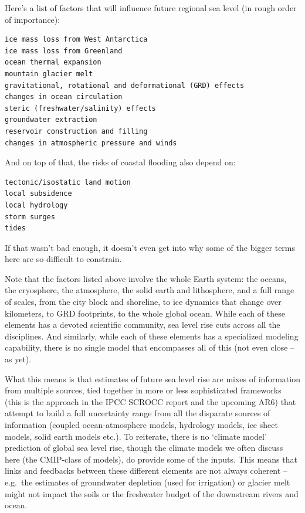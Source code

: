 \documentclass[
]{book}
\begin{document}
Here's a list of factors that will influence future regional sea level (in rough order of importance):

\begin{verbatim}
ice mass loss from West Antarctica
ice mass loss from Greenland
ocean thermal expansion
mountain glacier melt
gravitational, rotational and deformational (GRD) effects
changes in ocean circulation
steric (freshwater/salinity) effects
groundwater extraction
reservoir construction and filling
changes in atmospheric pressure and winds
\end{verbatim}

And on top of that, the risks of coastal flooding also depend on:

\begin{verbatim}
tectonic/isostatic land motion
local subsidence
local hydrology
storm surges
tides
\end{verbatim}

If that wasn't bad enough, it doesn't even get into why some of the bigger terms here are so difficult to constrain.

Note that the factors listed above involve the whole Earth system: the oceans, the cryosphere, the atmosphere, the solid earth and lithosphere, and a full range of scales, from the city block and shoreline, to ice dynamics that change over kilometers, to GRD footprints, to the whole global ocean. While each of these elements has a devoted scientific community, sea level rise cuts across all the disciplines. And similarly, while each of these elements has a specialized modeling capability, there is no single model that encompasses all of this (not even close -- as yet).

What this means is that estimates of future sea level rise are mixes of information from multiple sources, tied together in more or less sophisticated frameworks (this is the approach in the IPCC SCROCC report and the upcoming AR6) that attempt to build a full uncertainty range from all the disparate sources of information (coupled ocean-atmosphere models, hydrology models, ice sheet models, solid earth models etc.). To reiterate, there is no `climate model' prediction of global sea level rise, though the climate models we often discuss here (the CMIP-class of models), do provide some of the inputs. This means that links and feedbacks between these different elements are not always coherent -- e.g.~the estimates of groundwater depletion (used for irrigation) or glacier melt might not impact the soils or the freshwater budget of the downstream rivers and ocean.
\end{document}
